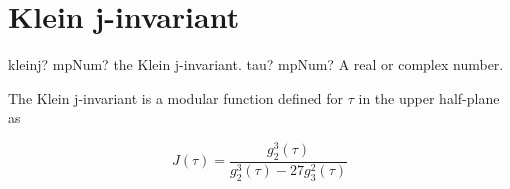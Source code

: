 %
%
%
%
%
%
%


\newpage
\section{Klein j-invariant}

\begin{mpFunctionsExtract}
	\mpFunctionOne
	{kleinj? mpNum? the Klein j-invariant.}
	{tau? mpNum? A real or complex number.}
\end{mpFunctionsExtract}

\vpara
The Klein j-invariant is a modular function defined for $\tau$ in the upper half-plane as

\begin{equation}
J(\tau) = \frac{g_2^3(\tau)}{g_2^3(\tau) - 27g_3^2(\tau)}
\end{equation}

